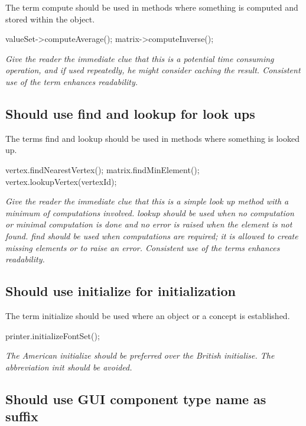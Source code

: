 \documentclass[a4paper,11pt,oneside]{scrbook}
\newcommand{\guideline}[1]{{\subsection{#1}}}
\newcommand{\motivation}[1]{{\normalfont \itshape #1}}
\newcommand{\trcode}[1]{{\normalfont \ttfamily #1}}
\begin{document}
The term \trcode{compute} should be used in methods where something is computed
and stored within the object.

\begin{code}
  valueSet->computeAverage();
  matrix->computeInverse(); 
\end{code}

\motivation{ 
  Give the reader the immediate clue that this is a potential time consuming
  operation, and if used repeatedly, he might consider caching the
  result. Consistent use of the term enhances readability.
}

\guideline{Should use \trcode{find} and \trcode{lookup} for look ups}

The terms \trcode{find} and \trcode{lookup} should be used in methods where
something is looked up.

\begin{code}
  vertex.findNearestVertex();
  matrix.findMinElement();
  vertex.lookupVertex(vertexId);
\end{code}

\motivation{
  Give the reader the immediate clue that this is a simple look up method with a
  minimum of computations involved. \trcode{lookup} should be used when no
  computation or minimal computation is done and no error is raised when the
  element is not found. \trcode{find} should be used when computations are
  required; it is allowed to create missing elements or to raise an
  error. Consistent use of the terms enhances readability.
}

\guideline{Should use \trcode{initialize} for initialization}

The term \trcode{initialize} should be used where an object or a concept is
established.

\begin{code}
  printer.initializeFontSet(); 
\end{code}

\motivation{
  The American initialize should be preferred over the British initialise.  The
  abbreviation \trcode{init} should be avoided.
}

\guideline{Should use GUI component type name as suffix}
\end{document}
